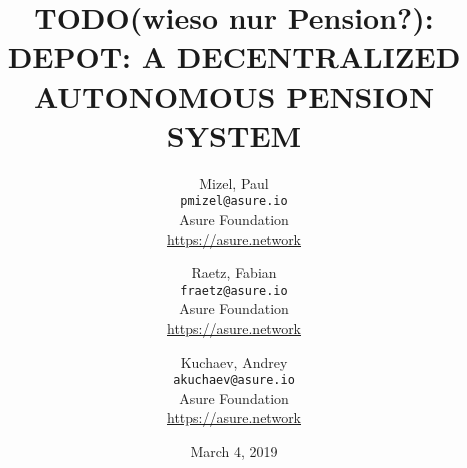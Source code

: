 
\title{TODO(wieso nur Pension?): DEPOT: A DECENTRALIZED AUTONOMOUS PENSION SYSTEM}
\author{
  Mizel, Paul\\
  \texttt{pmizel@asure.io}\\
  Asure Foundation \\ 
  {\url{https://asure.network}}\\
  \and
  Raetz, Fabian\\
  \texttt{fraetz@asure.io}\\
  Asure Foundation \\ 
  {\url{https://asure.network}}\\
  \and
  Kuchaev, Andrey\\
  \texttt{akuchaev@asure.io}\\
  Asure Foundation \\ 
  {\url{https://asure.network}}\\
}

\date{March 4, 2019}
\maketitle

